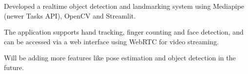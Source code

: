 \documentclass[../main.tex]{subfiles}
\begin{document}
\begin{tightemize}
\item Developed a realtime object detection and landmarking system
  using Mediapipe (newer Tasks API), OpenCV and Streamlit.
\item The application supports hand tracking, finger counting and
  face detection, and can be accessed via a web interface using
  WebRTC for video streaming.
\item Will be adding more features like pose estimation and object
  detection in the future.
\end{tightemize}
\end{document}

